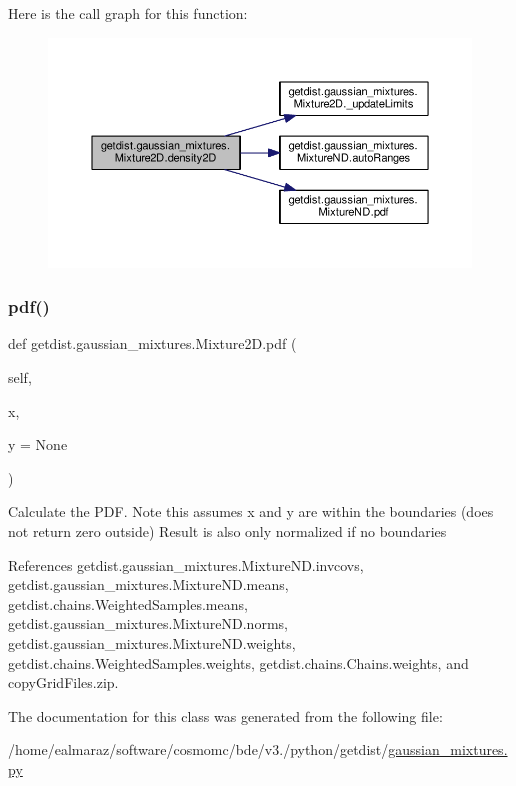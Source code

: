 Here is the call graph for this function\+:
\nopagebreak
\begin{figure}[H]
\begin{center}
\leavevmode
\includegraphics[width=350pt]{classgetdist_1_1gaussian__mixtures_1_1Mixture2D_a75c659c0a74007a020773d90f324f6bc_cgraph}
\end{center}
\end{figure}
\mbox{\label{classgetdist_1_1gaussian__mixtures_1_1Mixture2D_aa5f1666d0810f7e788881d776dfd797d}} 
\subsubsection{\texorpdfstring{pdf()}{pdf()}}
{\footnotesize\ttfamily def getdist.\+gaussian\+\_\+mixtures.\+Mixture2\+D.\+pdf (\begin{DoxyParamCaption}\item[{}]{self,  }\item[{}]{x,  }\item[{}]{y = {\ttfamily None} }\end{DoxyParamCaption})}

\begin{DoxyVerb}Calculate the PDF. Note this assumes x and y are within the boundaries (does not return zero outside)
Result is also only normalized if no boundaries
\end{DoxyVerb}
 

References getdist.\+gaussian\+\_\+mixtures.\+Mixture\+N\+D.\+invcovs, getdist.\+gaussian\+\_\+mixtures.\+Mixture\+N\+D.\+means, getdist.\+chains.\+Weighted\+Samples.\+means, getdist.\+gaussian\+\_\+mixtures.\+Mixture\+N\+D.\+norms, getdist.\+gaussian\+\_\+mixtures.\+Mixture\+N\+D.\+weights, getdist.\+chains.\+Weighted\+Samples.\+weights, getdist.\+chains.\+Chains.\+weights, and copy\+Grid\+Files.\+zip.



The documentation for this class was generated from the following file\+:\begin{DoxyCompactItemize}
\item 
/home/ealmaraz/software/cosmomc/bde/v3./python/getdist/\mbox{\hyperlink{gaussian__mixtures_8py}{gaussian\+\_\+mixtures.\+py}}\end{DoxyCompactItemize}
